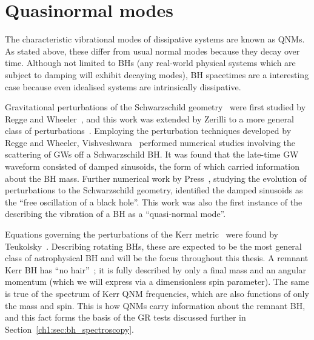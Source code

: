 

\section{Quasinormal modes}
\label{ch1:sec:qnms}

The characteristic vibrational modes of dissipative systems are known as QNMs.
As stated above, these differ from usual normal modes because they decay over time.
Although not limited to BHs (any real-world physical systems which are subject to damping will exhibit decaying modes), BH spacetimes are a interesting case because even idealised systems are intrinsically dissipative. 

Gravitational perturbations of the Schwarzschild geometry~\cite{Schwarzschild:1916uq} were first studied by Regge and Wheeler~\cite{Regge:1957td}, and this work was extended by Zerilli to a more general class of perturbations~\cite{Zerilli:1970se, Zerilli:1970wzz}.
Employing the perturbation techniques developed by Regge and Wheeler, Vishveshwara~\cite{Vishveshwara:1970zz} performed numerical studies involving the scattering of GWs off a Schwarzschild BH.
It was found that the late-time GW waveform consisted of damped sinusoids, the form of which carried information about the BH mass. 
Further numerical work by Press~\cite{Press:1971wr}, studying the evolution of perturbations to the Schwarzschild geometry, identified the damped sinusoids as the ``free oscillation of a black hole''.
This work was also the first instance of the describing the vibration of a BH as a ``quasi-normal mode''.

Equations governing the perturbations of the Kerr metric~\cite{Kerr:1963ud} were found by Teukolsky~\cite{Teukolsky:1972my}. 
Describing rotating BHs, these are expected to be the most general class of astrophysical BH and will be the focus throughout this thesis. 
A remnant Kerr BH has ``no hair''~\cite{Carter:1971zc}; it is fully described by only a final mass and an angular momentum (which we will express via a dimensionless spin parameter). 
The same is true of the spectrum of Kerr QNM frequencies, which are also functions of only the mass and spin. 
This is how QNMs carry information about the remnant BH, and this fact forms the basis of the GR tests discussed further in Section~\ref{ch1:sec:bh_spectroscopy}.

